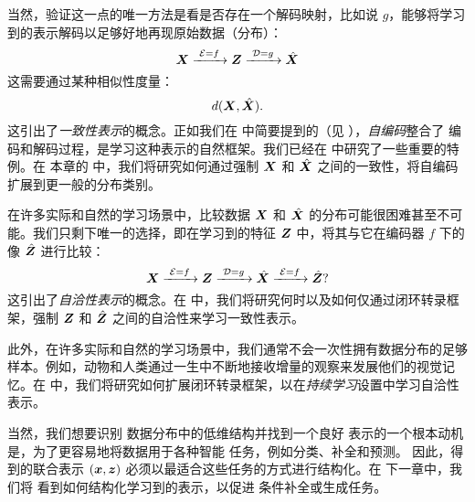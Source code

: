 \documentclass[../../book-main.tex]{subfiles}
\begin{document}
当然，验证这一点的唯一方法是看是否存在一个解码映射，比如说 $g$，能够将学习到的表示解码以足够好地再现原始数据（分布）：
\begin{equation}
  \bm{X}
  \xrightarrow{\hspace{1mm} \mathcal{E} = f \hspace{1mm}} \bm{Z}
  \xrightarrow{\hspace{1mm} \mathcal{D} = g \hspace{1mm}} \hat{\bm{X}}
\end{equation}
这需要通过某种相似性度量：
\begin{equation}
  d(\bm{X}, \hat {\bm{X}}).
\end{equation}
这引出了{\em 一致性表示}的概念。正如我们在
 中简要提到的（见 ），{\em 自编码}整合了
编码和解码过程，是学习这种表示的自然框架。我们已经在  中研究了一些重要的特例。在
本章的  中，我们将研究如何通过强制 $\bm{X}$ 和 $\hat {\bm{X}}$ 之间的一致性，将自编码扩展到更一般的分布类别。

在许多实际和自然的学习场景中，比较数据 $\bm{X}$ 和 $\hat {\bm{X}}$ 的分布可能很困难甚至不可能。我们只剩下唯一的选择，即在学习到的特征 $\bm{Z}$ 中，将其与它在编码器 $f$ 下的像 $\hat {\bm{Z}}$ 进行比较：
\begin{equation}
 \bm{X}
\xrightarrow{\hspace{1mm} \mathcal{E} = f \hspace{1mm}} \bm{Z}  \xrightarrow{\hspace{1mm} \mathcal{D} = g \hspace{1mm}} \hat{\bm{X}} \xrightarrow{\hspace{1mm} \mathcal{E} = f \hspace{1mm}} \hat {\bm{Z}}?
\end{equation}
这引出了{\em 自洽性表示}的概念。在  中，我们将研究何时以及如何仅通过闭环转录框架，强制 $\bm{Z}$ 和 $\hat {\bm{Z}}$ 之间的自洽性来学习一致性表示。

此外，在许多实际和自然的学习场景中，我们通常不会一次性拥有数据分布的足够样本。例如，动物和人类通过一生中不断地接收增量的观察来发展他们的视觉记忆。在  中，我们将研究如何扩展闭环转录框架，以在{\em 持续学习}设置中学习自洽性表示。

当然，我们想要识别
数据分布中的低维结构并找到一个良好
表示的一个根本动机是，为了更容易地将数据用于各种智能
任务，例如分类、补全和预测。
因此，得到的联合表示 $(\bm{x}, \bm{z})$ 必须以最适合这些任务的方式进行结构化。在
下一章中，我们将
看到如何结构化学习到的表示，以促进
条件补全或生成任务。
\end{document}
